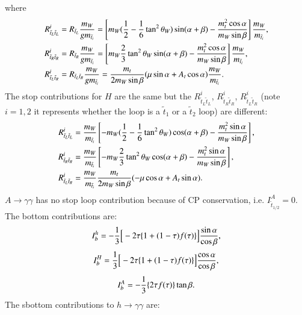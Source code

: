 \documentclass[final,3p,times]{elsarticle}
\begin{document}
where
\begin{align}
R_{\tilde{t}_L \tilde{t}_L}^i &= R_{\tilde{t}_L} {m_{W} \over g m_{\tilde{t}_i}} = \left[m_W ({1 \over 2}-{1 \over 6}\tan^2 \theta_W)\sin(\alpha+\beta) - {m_{t}^2 \cos \alpha \over m_{W} \sin \beta}\right]{m_W \over  m_{\tilde{t}_i}}, \\
R_{\tilde{t}_R \tilde{t}_R}^i &= R_{\tilde{t}_R} {m_{W} \over g m_{\tilde{t}_i}} = \left[m_W{2 \over 3} \tan^2 \theta_W  \sin(\alpha+\beta) - {m_{t}^2 \cos \alpha \over m_{W} \sin \beta}\right]{m_W \over m_{\tilde{t}_i}}, \\
R_{\tilde{t}_L \tilde{t}_R}^i &= R_{\tilde{t}_L \tilde{t}_R} {m_W \over g m_{\tilde{t}_i}} = {m_t \over 2 m_W \sin\beta}(\mu \sin\alpha + A_t \cos\alpha){m_W \over m_{\tilde{t}_i}}.
\end{align}
The stop contributions for $H$ are the same but the $R_{\tilde{t}_L \tilde{t}_L}^i$, $R_{\tilde{t}_R \tilde{t}_R}^i$,  $R_{\tilde{t}_L \tilde{t}_R}^i$ (note $i=1,2$ it represents whether the loop is a $\tilde{t}_1$ or a $\tilde{t}_2$ loop) are different:
\begin{align}
R_{\tilde{t}_L \tilde{t}_L}^i &= {m_{W} \over m_{\tilde{t}_i}}\left[-m_W ({1 \over 2} - {1 \over 6}\tan^2 \theta_W)\cos(\alpha+\beta) -{m_{t}^2 \sin\alpha \over m_{W}\sin\beta}\right], \\
R_{\tilde{t}_R \tilde{t}_R}^i &= {m_{W} \over m_{\tilde{t}_i}}\left[-m_W {2 \over 3}\tan^2 \theta_W\cos(\alpha+\beta) -{m_{t}^2 \sin\alpha \over m_{W}\sin\beta}\right], \\
R_{\tilde{t}_L \tilde{t}_R}^i &= {m_W \over m_{\tilde{t}_i}} {m_t \over 2 m_W \sin\beta}(-\mu \cos\alpha + A_t \sin\alpha).
\end{align}
$A \rightarrow \gamma \gamma$ has no stop loop contribution because of CP conservation, i.e. $I_{\tilde{t}_{1/2}}^A = 0$.
The bottom contributions are:
\begin{equation}
I_{b}^h = -{1 \over 3}\Big[-2\tau\{1+(1-\tau)f(\tau)\}\Big]{\sin\alpha \over \cos\beta},
\end{equation}
\begin{equation}
I_{b}^H = {1 \over 3}\Big[-2\tau\{1+(1-\tau)f(\tau)\}\Big]{\cos\alpha \over \cos\beta},
\end{equation}
\begin{equation}
I_{b}^A = -{1 \over 3}\{2\tau f(\tau)\}\tan\beta.
\end{equation}
The sbottom contributions to $h \rightarrow \gamma \gamma$ are:
\end{document}
